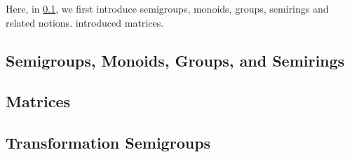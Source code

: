
Here, in \cref{prelim:sec:semigroups_monoids_grps},
we first introduce semigroups, monoids, groups, semirings and related notions.
 introduced matrices.

\subsection{Semigroups, Monoids, Groups, and Semirings}
\label{prelim:sec:semigroups_monoids_grps}



\subsection{Matrices}
\label{prelim:sec:mtx}



\subsection{Transformation Semigroups}
\label{sec:transgrp:basic-notions}

